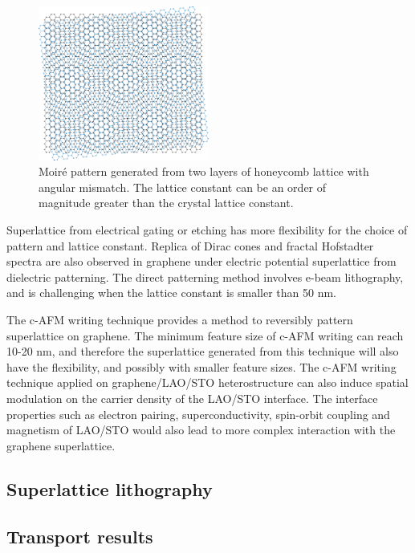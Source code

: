 \documentclass[pdflatex, sectionletters, 12pt]{pittetd}    %
\begin{document}
\begin{figure}[h!]
	\centering
	\includegraphics[width=0.5\textwidth]{Drawing/Moire.pdf}
	\caption{Moir{\'e} pattern generated from two layers of honeycomb lattice with angular mismatch. The lattice constant can be an order of magnitude greater than the crystal lattice constant.}
	\label{FIG:Moire}
\end{figure}

Superlattice from electrical gating\cite{forsythe2018band} or etching\cite{jessen2019lithographic} has more flexibility for the choice of pattern and lattice constant. Replica of Dirac cones and fractal Hofstadter spectra are also observed in graphene under electric potential superlattice from dielectric patterning. The direct patterning method involves e-beam lithography, and is challenging when the lattice constant is smaller than 50 nm.

The c-AFM writing technique provides a method to reversibly pattern superlattice on graphene. The minimum feature size of c-AFM writing can reach 10-20 nm\cite{huang2015electric}, and therefore the superlattice generated from this technique will also have the flexibility, and possibly with smaller feature sizes. The c-AFM writing technique applied on graphene/LAO/STO heterostructure can also induce spatial modulation on the carrier density of the LAO/STO interface. The interface properties such as electron pairing\cite{cheng2015electron}, superconductivity\cite{reyren2007superconducting}, spin-orbit coupling\cite{zhong2013theory} and magnetism\cite{bi2014room} of LAO/STO would also lead to more complex interaction with the graphene superlattice.

\subsection{Superlattice lithography}

\subsection{Transport results}
\end{document}

